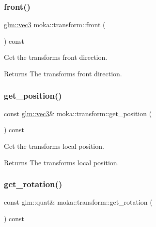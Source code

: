 \subsubsection{\texorpdfstring{front()}{front()}}
{\footnotesize\ttfamily \mbox{\hyperlink{namespacemoka_aed2224bc0e5b79e57a8975ded94ee1aaa97ade28e93c0de60adc075bdbe07ca36}{glm\+::vec3}} moka\+::transform\+::front (\begin{DoxyParamCaption}{ }\end{DoxyParamCaption}) const}



Get the transform\textquotesingle{}s front direction. 

\begin{DoxyReturn}{Returns}
The transform\textquotesingle{}s front direction. 
\end{DoxyReturn}
\mbox{\label{classmoka_1_1transform_aa14faed346ff209df8181a6d75bd1654}} 
\subsubsection{\texorpdfstring{get\_position()}{get\_position()}}
{\footnotesize\ttfamily const \mbox{\hyperlink{namespacemoka_aed2224bc0e5b79e57a8975ded94ee1aaa97ade28e93c0de60adc075bdbe07ca36}{glm\+::vec3}}\& moka\+::transform\+::get\+\_\+position (\begin{DoxyParamCaption}{ }\end{DoxyParamCaption}) const}



Get the transform\textquotesingle{}s local position. 

\begin{DoxyReturn}{Returns}
The transform\textquotesingle{}s local position. 
\end{DoxyReturn}
\mbox{\label{classmoka_1_1transform_a4bb68582d14ce69a418fceecc312a686}} 
\subsubsection{\texorpdfstring{get\_rotation()}{get\_rotation()}}
{\footnotesize\ttfamily const glm\+::quat\& moka\+::transform\+::get\+\_\+rotation (\begin{DoxyParamCaption}{ }\end{DoxyParamCaption}) const}



